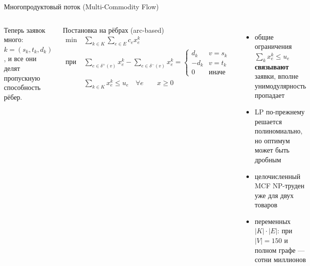 \documentclass[aspectratio=169,10pt]{beamer}
\begin{document}
\begin{frame}{Многопродуктовый поток (Multi-Commodity Flow)}
\begin{columns}[T]
Теперь заявок много: $k=(s_k,t_k,d_k)$, и все они делят пропускную способность рёбер.
\begin{block}{Постановка на рёбрах (arc-based)}
\vspace{-6pt}
\begin{align*}
\min\ & \sum_{k\in K}\sum_{e\in E} c_e x^k_e\\
\text{при}\ & \sum_{e\in\delta^+(v)}x^k_e-\sum_{e\in\delta^-(v)}x^k_e=
\begin{cases} d_k & v=s_k\\ -d_k & v=t_k\\ 0&\text{иначе}\end{cases}\\
& \sum_{k\in K} x^k_e\le u_e\quad\forall e\qquad x\ge 0
\end{align*}
\end{block}
\begin{itemize}\setlength{\itemsep}{4pt}
\item общие ограничения $\sum_k x^k_e\le u_e$ \textbf{связывают} заявки, вполне унимодулярность пропадает
\item LP по-прежнему решается полиномиально, но оптимум может быть \alert{дробным}
\item целочисленный MCF NP-труден уже для двух товаров
\item переменных $|K|\cdot|E|$: при $|V|=150$ и полном графе --- сотни миллионов
\end{itemize}
\end{columns}
\end{frame}
\end{document}
